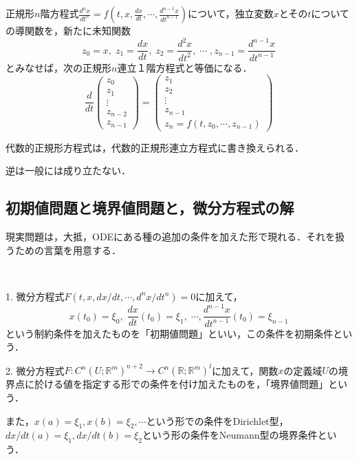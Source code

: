 \documentclass[uplatex,dvipdfmx]{jsreport}
\begin{document}
\begin{proposition}
    正規形$n$階方程式$\frac{d^nx}{dt^n} = f\left( t,x,\frac{dx}{dt},\cdots,\frac{d^{n-1}x}{dt^{n-1}} \right)$について，独立変数$x$とその$t$についての導関数を，新たに未知関数
    \[ z_0=x,\; z_1=\frac{dx}{dt},\; z_2=\frac{d^2x}{dt^2},\;\cdots\;, z_{n-1}=\frac{d^{n-1}x}{dt^{n-1}}  \]
    とみなせば，次の正規形$n$連立１階方程式と等価になる．
    \[ \frac{d}{dt}\left(\begin{array}{c}z_0\\z_1 \\ \vdots \\ z_{n-2}\\z_{n-1}\end{array}\right) = \left(\begin{array}{c}z_1\\z_2 \\ \vdots \\ z_{n-1}\\z_n=f(t,z_0,\cdots,z_{n-1})\end{array}\right) \]
\end{proposition}

\begin{proposition}
    代数的正規形方程式は，代数的正規形連立方程式に書き換えられる．
\end{proposition}
\begin{remark}
    逆は一般には成り立たない．
\end{remark}

\subsection{初期値問題と境界値問題と，微分方程式の解}

現実問題は，大抵，ODEにある種の追加の条件を加えた形で現れる．それを扱うための言葉を用意する．
\begin{screen}
    \begin{definition}[初期値問題と境界値問題]　

        1. 微分方程式$F(t,x,dx/dt,\cdots,d^nx/dt^n)=0$に加えて，
        \[ x(t_0)=\xi_0,\; \frac{dx}{dt}(t_0)=\xi_1,\;\cdots,\frac{d^{n-1}x}{dt^{n-1}}(t_0)=\xi_{n-1} \]
        という制約条件を加えたものを「初期値問題」といい，この条件を初期条件という．

        2. 微分方程式$F:C^n(U;\mathbb{R}^m)^{n+2}\to C^n(\mathbb{R};\mathbb{R}^m)^l$に加えて，関数$x$の定義域$U$の境界点に於ける値を指定する形での条件を付け加えたものを，「境界値問題」という．

        また，$x(a)=\xi_1,x(b)=\xi_2,\cdots$という形での条件をDirichlet型，$dx/dt(a)=\xi_1, dx/dt(b)=\xi_2$という形の条件をNeumann型の境界条件という．
    \end{definition}
\end{screen}
\end{document}
